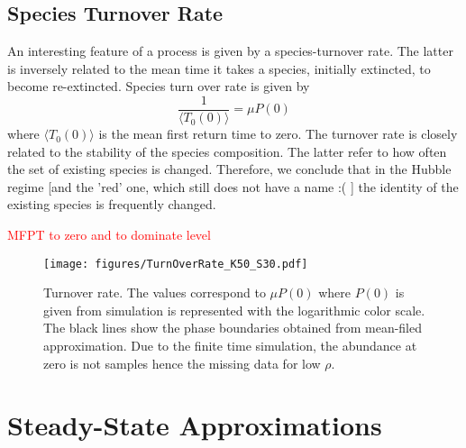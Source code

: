 \documentclass[%
 amsmath,amssymb,
 reprint,%
]{revtex4-2}
\begin{document}
\subsection{Species Turnover Rate}

An interesting feature of a process is given by a species-turnover rate. The latter is inversely related to the mean time it takes a species, initially extincted, to become re-extincted.   
Species turn over rate is given by
\begin{equation}
    \frac{1}{\langle T_0 (0) \rangle} = \mu P(0)
\end{equation}
where $\langle T_0 (0) \rangle$ is the mean first return time to zero. 
The turnover rate is closely related to the stability of the species composition. The latter refer to how often the set of existing species is changed. Therefore, we conclude that in the Hubble regime [and the 'red' one, which still does not have a name :( ] the identity of the existing species is frequently changed. 

\textcolor{red}{MFPT to zero and to dominate level}

\begin{figure}
    \centering
    \texttt{[image: figures/TurnOverRate\_K50\_S30.pdf]}
    \caption{Turnover rate. The values correspond to $\mu P(0)$ where $P(0)$ is given from simulation is represented with the logarithmic color scale. The black lines show the phase boundaries obtained from mean-filed approximation. Due to the finite time simulation, the abundance at zero is not samples  hence the missing data for low $\rho$.}
    \label{fig:turnover}
\end{figure}





\section{Steady-State Approximations }
\end{document}
